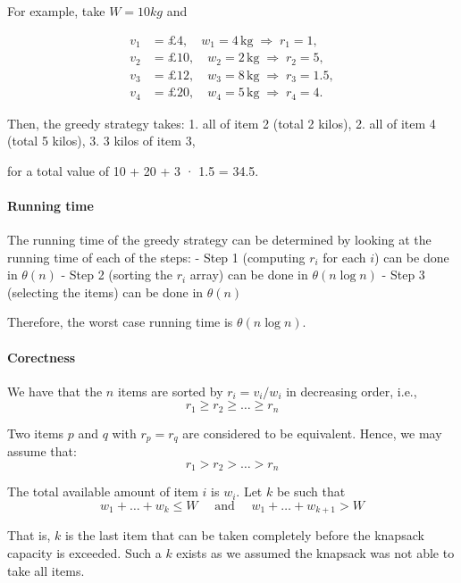 \documentclass[11pt]{article}
\begin{document}
For example, take \(W = 10kg\) and

\[
\begin{aligned}
v_1 &= \pounds{}4, \quad w_1 = 4\,\text{kg} \;\Rightarrow\; r_1 = 1,\\
v_2 &= \pounds{}10, \quad w_2 = 2\,\text{kg} \;\Rightarrow\; r_2 = 5,\\
v_3 &= \pounds{}12, \quad w_3 = 8\,\text{kg} \;\Rightarrow\; r_3 = 1.5,\\
v_4 &= \pounds{}20, \quad w_4 = 5\,\text{kg} \;\Rightarrow\; r_4 = 4.
\end{aligned}
\]

Then, the greedy strategy takes: 1. all of item 2 (total 2 kilos), 2.
all of item 4 (total 5 kilos), 3. 3 kilos of item 3,

for a total value of 10 + 20 + 3 · 1.5 = 34.5.

    \paragraph{Running time}\label{running-time}

The running time of the greedy strategy can be determined by looking at
the running time of each of the steps: - Step 1 (computing \(r_i\) for
each \(i\)) can be done in \(\theta(n)\) - Step 2 (sorting the \(r_i\)
array) can be done in \(\theta(n \log n)\) - Step 3 (selecting the
items) can be done in \(\theta(n)\)

Therefore, the worst case running time is \(\theta(n \log n)\).

    \paragraph{Corectness}\label{corectness}

We have that the \(n\) items are sorted by \(r_i = v_i / w_i\) in
decreasing order, i.e., \[ r_1 \geq r_2 \geq \ldots \geq r_n\]

Two items \(p\) and \(q\) with \(r_p = r_q\) are considered to be
equivalent. Hence, we may assume that: \[ r_1 > r_2 > \ldots > r_n\]

The total available amount of item \(i\) is \(w_i\). Let \(k\) be such
that
\[w_1 + \ldots + w_k \leq W \quad \text{ and } \quad w_1 + \ldots + w_{k+1} > W\]

That is, \(k\) is the last item that can be taken completely before the
knapsack capacity is exceeded. Such a \(k\) exists as we assumed the
knapsack was not able to take all items.
\end{document}
